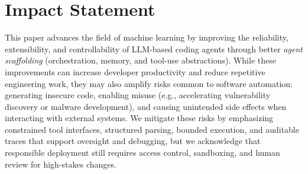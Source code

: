 \section*{Impact Statement}

This paper advances the field of machine learning by improving the reliability, extensibility, and controllability of LLM-based coding agents through better \emph{agent scaffolding} (orchestration, memory, and tool-use abstractions). 
While these improvements can increase developer productivity and reduce repetitive engineering work, they may also amplify risks common to software automation: generating insecure code, enabling misuse (e.g., accelerating vulnerability discovery or malware development), and causing unintended side effects when interacting with external systems. We mitigate these risks by emphasizing constrained tool interfaces, structured parsing, bounded execution, and auditable traces that support oversight and debugging, but we acknowledge that responsible deployment still requires access control, sandboxing, and human review for high-stakes changes. 


